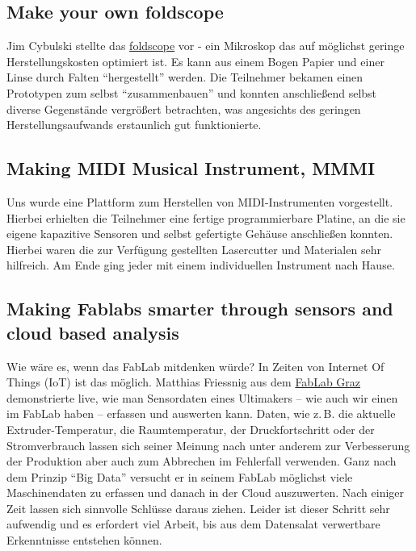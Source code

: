\documentclass{\basedir/fablab-document}
\begin{document}
\subsection*{Make your own foldscope}

Jim Cybulski stellte das \href{https://en.wikipedia.org/wiki/Foldscope}{foldscope}
vor - ein Mikroskop das auf
möglichst geringe Herstellungskosten optimiert ist. Es kann aus einem
Bogen Papier und einer Linse durch Falten \enquote{hergestellt} werden. Die
Teilnehmer bekamen einen Prototypen zum selbst \enquote{zusammenbauen} und
konnten anschließend selbst diverse Gegenstände vergrößert betrachten,
was angesichts des geringen Herstellungsaufwands erstaunlich gut
funktionierte.

\subsection*{Making MIDI Musical Instrument, MMMI}

Uns wurde eine Plattform zum Herstellen von MIDI-Instrumenten
vorgestellt. Hierbei erhielten die Teilnehmer eine fertige
programmierbare Platine, an die sie eigene kapazitive Sensoren und
selbst gefertigte Gehäuse anschließen konnten. Hierbei waren die zur
Verfügung gestellten Lasercutter und Materialen sehr hilfreich. Am Ende
ging jeder mit einem individuellen Instrument nach Hause.

\subsection*{Making Fablabs smarter through sensors and cloud based analysis}

Wie wäre es, wenn das FabLab mitdenken würde? In Zeiten von Internet Of
Things (IoT) ist das möglich. Matthias Friessnig aus dem
\href{http://fablab.tugraz.at/}{FabLab Graz} demonstrierte live, wie man
Sensordaten eines Ultimakers -- wie auch wir einen im FabLab haben --
erfassen und auswerten kann. Daten, wie z.\,B. die aktuelle Extruder-Temperatur,
die Raumtemperatur, der Druckfortschritt oder der
Stromverbrauch lassen sich seiner Meinung nach unter anderem zur
Verbesserung der Produktion aber auch zum Abbrechen im Fehlerfall
verwenden. Ganz nach dem Prinzip \enquote{Big Data} versucht er in seinem
FabLab möglichst viele Maschinendaten zu erfassen und danach in der
Cloud auszuwerten. Nach einiger Zeit lassen sich sinnvolle Schlüsse
daraus ziehen. Leider ist dieser Schritt sehr aufwendig und es erfordert
viel Arbeit, bis aus dem Datensalat verwertbare Erkenntnisse entstehen können.
\end{document}
